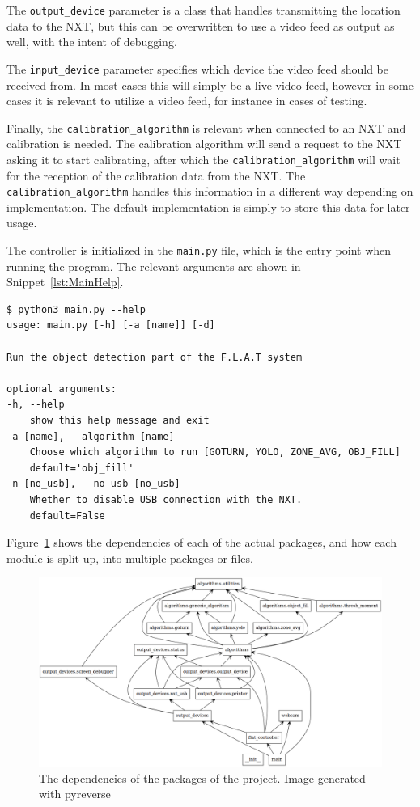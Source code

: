 The \texttt{output\_device} parameter is a class that handles transmitting the location data to the NXT, but this can be overwritten to use a video feed as output as well, with the intent of debugging.

The \texttt{input\_device} parameter specifies which device the video feed should be received from. 
In most cases this will simply be a live video feed, however in some cases it is relevant to utilize a video feed, for instance in cases of testing.

Finally, the \texttt{calibration\_algorithm} is relevant when connected to an NXT and calibration is needed. 
The calibration algorithm will send a request to the NXT asking it to start calibrating, after which the \texttt{calibration\_algorithm} will wait for the reception of the calibration data from the NXT. 
The \texttt{calibration\_algorithm} handles this information in a different way depending on implementation.
The default implementation is simply to store this data for later usage.

The controller is initialized in the \texttt{main.py} file, which is the entry point when running the program. 
The relevant arguments are shown in Snippet~\ref{lst:MainHelp}.
\begin{lstlisting}[label={lst:MainHelp},caption={The help message of the commandline interface}]
$ python3 main.py --help
usage: main.py [-h] [-a [name]] [-d]

Run the object detection part of the F.L.A.T system

optional arguments:
-h, --help            
	show this help message and exit
-a [name], --algorithm [name] 
	Choose which algorithm to run [GOTURN, YOLO, ZONE_AVG, OBJ_FILL]
	default='obj_fill'
-n [no_usb], --no-usb [no_usb]
	Whether to disable USB connection with the NXT.
	default=False
\end{lstlisting}
Figure~\ref{fig:pythonClasses} shows the dependencies of each of the actual packages, and how each module is split up, into multiple packages or files.

\begin{figure}[H]
	\centering
	\includegraphics[width=\textwidth]{5.Solution/images/python_packages.png}
	\caption{The dependencies of the packages of the project{.} Image generated with pyreverse\cite{pyreverse}}
	\label{fig:pythonClasses}
\end{figure}


